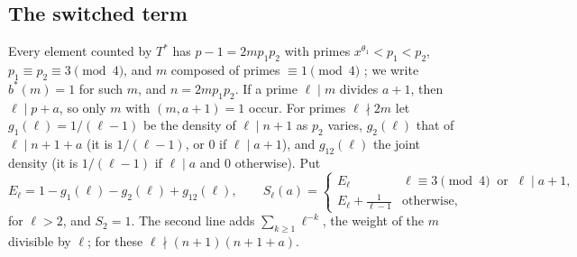 \documentclass[11pt,a4paper]{amsart}
\theoremstyle{remark}
\numberwithin{equation}{section}
\begin{document}
\subsection{The switched term}
Every element counted by $T^\ast$ has $p-1=2mp_1p_2$ with primes $x^{\theta_1}<p_1<p_2$, $p_1\equiv p_2\equiv3\pmod4$,
and $m$ composed of primes $\equiv1\pmod 4$ \cite[(4.8)]{NX}; we write $b^\ast(m)=1$ for such $m$, and $n=2mp_1p_2$.
If a prime $\ell\mid m$ divides $a+1$, then $\ell\mid p+a$, so only $m$ with $(m,a+1)=1$ occur. For primes
$\ell\nmid2m$ let $g_1(\ell)=1/(\ell-1)$ be the density of $\ell\mid n+1$ as $p_2$ varies, $g_2(\ell)$ that of
$\ell\mid n+1+a$ (it is $1/(\ell-1)$, or $0$ if $\ell\mid a+1$), and $g_{12}(\ell)$ the joint density (it is
$1/(\ell-1)$ if $\ell\mid a$ and $0$ otherwise). Put
\begin{equation}\label{eq:Sl}
E_\ell=1-g_1(\ell)-g_2(\ell)+g_{12}(\ell),\qquad
S_\ell(a)=\begin{cases}E_\ell&\ell\equiv3\!\!\pmod 4\ \text{ or }\ \ell\mid a+1,\\ E_\ell+\frac1{\ell-1}&\text{otherwise},\end{cases}
\end{equation}
for $\ell>2$, and $S_2=1$. The second line adds $\sum_{k\ge1}\ell^{-k}$, the weight of the $m$ divisible by
$\ell$; for these $\ell\nmid(n+1)(n+1+a)$.
\end{document}
